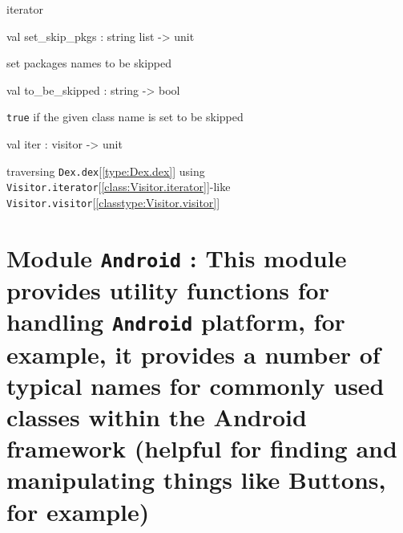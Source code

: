 \documentclass[11pt]{article}
\begin{document}
\begin{ocamldocdescription}
iterator


\end{ocamldocdescription}




\label{val:Visitor.set-underscoreskip-underscorepkgs}\begin{ocamldoccode}
val set_skip_pkgs : string list -> unit
\end{ocamldoccode}
\begin{ocamldocdescription}
set packages names to be skipped


\end{ocamldocdescription}




\label{val:Visitor.to-underscorebe-underscoreskipped}\begin{ocamldoccode}
val to_be_skipped : string -> bool
\end{ocamldoccode}
\begin{ocamldocdescription}
{\tt{true}} if the given class name is set to be skipped


\end{ocamldocdescription}




\label{val:Visitor.iter}\begin{ocamldoccode}
val iter : visitor -> unit
\end{ocamldoccode}
\begin{ocamldocdescription}
traversing {\tt{Dex.dex}}[\ref{type:Dex.dex}] using {\tt{Visitor.iterator}}[\ref{class:Visitor.iterator}]-like {\tt{Visitor.visitor}}[\ref{classtype:Visitor.visitor}]


\end{ocamldocdescription}


\section{Module {\tt{Android}} : This module provides utility functions for handling {\tt{Android}}
    platform, for example, it provides a number of typical names for
    commonly used classes within the Android framework (helpful for
    finding and manipulating things like Buttons, for example)}
\label{module:Android}
\end{document}
